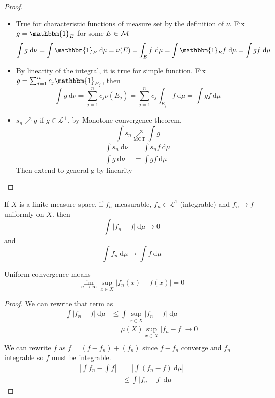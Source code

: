 \begin{proof}
  \begin{itemize}
    \item True for characteristic functions of measure set by the definition of $\nu$.
    Fix $g = \mathbbm{1}_E$ for some $E \in \mathcal M$
    $$
      \int g\ \mathrm{d}\nu =\int \mathbbm{1}_E \ \mathrm{d}\mu= \nu(E) = \int_E f \ \mathrm{d}\mu = \int \mathbbm{1}_E f \ \mathrm{d}\mu = \int g f \ \mathrm{d}\mu
    $$
    \item By linearity of the integral, it is true for simple function.
    Fix $g = \sum_{j=1}^n c_j \mathbbm{1}_{E_j}$, then
    $$
      \int g\ \mathrm{d}\nu = \sum_{j=1}^n c_j \nu(E_j) = \sum_{j=1}^n c_j \int_{E_j} f \ \mathrm{d}\mu = \int g f \ \mathrm{d}\mu
    $$

    \item  $s_n\nearrow g$ if $g \in \mathcal{L}^+$, by Monotone convergence theorem, 
    \[\int s_n \underset{\text{MCT}}\nearrow \int g\]
    \begin{align*}
      \int s_n \ \mathrm{d}\nu &= \int s_n f \ \mathrm{d}\mu \\
      \int g \ \mathrm{d}\nu &= \int g f \ \mathrm{d}\mu
    \end{align*}
    Then extend to general g by linearity
  \end{itemize}
\end{proof}


\begin{theorem}
  If $X$ is a finite measure space, if $f_n$ measurable, $f_n \in \mathcal{L}^1$ (integrable) and $f_n \to f$ uniformly on $X$. 
  then $$\int |f_n - f| \ \mathrm{d}\mu \to 0$$
  and 
  $$\int f_n\ \mathrm{d}\mu \to \int f\ \mathrm{d}\mu$$
\end{theorem}
  
\begin{remark}
  Uniform convergence means
  \[\lim_{n \to \infty}\sup_{x \in X} |f_n(x) - f(x)| = 0\]
\end{remark}

\begin{proof}
  We can rewrite that term as 
  \begin{align*}
    \int |f_n - f| \ \mathrm{d}\mu &\le \int \sup_{x\in X} |f_n - f|\ \mathrm{d}\mu \\ 
    &= \mu(X) \sup_{x\in X} |f_n - f| \to 0\\
  \end{align*}
  We can rewrite $f$ as $f = (f - f_n) + (f_n)$ since $f-f_n$ converge and $f_n$ integrable so $f$ must be integrable.
  \begin{align*}
    \left|\int f_n - \int f\right| &= \left|\int (f_n - f)\ \mathrm{d}\mu\right| \\
    &\le \int |f_n - f|\ \mathrm{d}\mu 
  \end{align*}
\end{proof}

